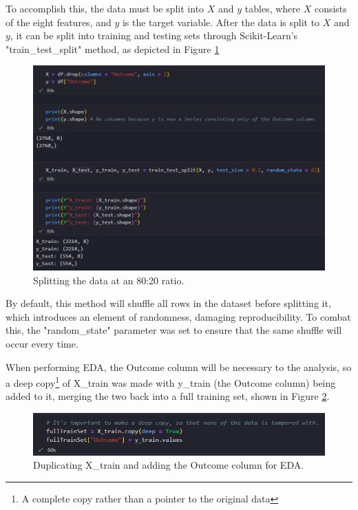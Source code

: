 \documentclass[12pt]{report}
\newcommand{\para}{\vspace{8pt}\noindent}
\begin{document}
\para To accomplish this, the data must be split into $X$ and $y$ tables, where $X$ consists of the eight features, and $y$ is the target variable.
After the data is split to $X$ and $y$, it can be split into training and testing sets through Scikit-Learn's "train\_test\_split" method, as depicted in Figure \ref{fig:TrainTestSplit}

\begin{figure}[H]
    \centering
    \includegraphics[width=\linewidth]{EDA/TrainTestSplit.png}
    \caption{Splitting the data at an 80:20 ratio.}
    \label{fig:TrainTestSplit}
\end{figure}

\para By default, this method will shuffle all rows in the dataset before splitting it, which introduces an element of randomness, damaging
reproducibility. To combat this, the "random\_state" parameter was set to ensure that the same shuffle will occur every time.

\para When performing EDA, the Outcome column will be necessary to the analysis, so a deep copy\footnote{A complete copy rather than a pointer to the original data}
of X\_train was made with y\_train (the Outcome column) being added to it, merging the two back into a full training set, shown in Figure \ref{fig:FullTrainingSet}.

\begin{figure}[H]
    \centering
    \includegraphics[width=\linewidth]{EDA/FullTrainingSet.png}
    \caption{Duplicating X\_train and adding the Outcome column for EDA.}
    \label{fig:FullTrainingSet}
\end{figure}
\end{document}
